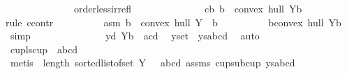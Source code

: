 \begin{isabellebody}
\ \ \ \ \ \ \ \ \ \ \ \ \ \ order{\isacharunderscore}{\kern0pt}less{\isacharunderscore}{\kern0pt}irrefl{\isacharparenright}{\kern0pt}\isanewline
\ \ \ \ \ \ \isamarkupfalse%
\isanewline
\ \ \ \ \ \ \isamarkupfalse%
\ cb{\isacharcolon}{\kern0pt}{\isachardoublequoteopen}{\isasymnot}\ b\ {\isasymin}\ convex\ hull\ {\isacharparenleft}{\kern0pt}Y{\isacharminus}{\kern0pt}{\isacharbraceleft}{\kern0pt}b{\isacharbraceright}{\kern0pt}{\isacharparenright}{\kern0pt}{\isachardoublequoteclose}\isanewline
\ \ \ \ \ \ \isamarkupfalse%
{\isacharparenleft}{\kern0pt}rule\ ccontr{\isacharparenright}{\kern0pt}\isanewline
\ \ \ \ \ \ \ \ \isamarkupfalse%
\ asm{\isacharcolon}{\kern0pt}{\isachardoublequoteopen}{\isasymnot}\ b\ {\isasymnotin}\ convex\ hull\ {\isacharparenleft}{\kern0pt}Y\ {\isacharminus}{\kern0pt}\ {\isacharbraceleft}{\kern0pt}b{\isacharbraceright}{\kern0pt}{\isacharparenright}{\kern0pt}{\isachardoublequoteclose}\isanewline
\ \ \ \ \ \ \ \ \isamarkupfalse%
\ {\isachardoublequoteopen}b{\isasymin}convex\ hull\ {\isacharparenleft}{\kern0pt}Y{\isacharminus}{\kern0pt}{\isacharbraceleft}{\kern0pt}b{\isacharbraceright}{\kern0pt}{\isacharparenright}{\kern0pt}{\isachardoublequoteclose}\ \isamarkupfalse%
\ simp\isanewline
\ \ \ \ \ \ \ \ \ \ \ \ \ \isamarkupfalse%
\ y{\isacharunderscore}{\kern0pt}d{\isacharcolon}{\kern0pt}\ {\isachardoublequoteopen}Y{\isacharminus}{\kern0pt}{\isacharbraceleft}{\kern0pt}b{\isacharbraceright}{\kern0pt}\ {\isacharequal}{\kern0pt}\ {\isacharbraceleft}{\kern0pt}a{\isacharcomma}{\kern0pt}c{\isacharcomma}{\kern0pt}d{\isacharbraceright}{\kern0pt}{\isachardoublequoteclose}\ \isamarkupfalse%
\ y{\isacharunderscore}{\kern0pt}set\ {\isachardoublequoteopen}{}{}{\isachardoublequoteclose}\ ys{\isacharunderscore}{\kern0pt}abcd\ \isamarkupfalse%
\ auto\isanewline
\ \ \ \ \ \ \ \ \isamarkupfalse%
\ cup{\isacharunderscore}{\kern0pt}ls{\isacharcolon}{\kern0pt}{\isachardoublequoteopen}cup\ {}\ {\isacharbrackleft}{\kern0pt}a{\isacharcomma}{\kern0pt}b{\isacharcomma}{\kern0pt}c{\isacharcomma}{\kern0pt}d{\isacharbrackright}{\kern0pt}{\isachardoublequoteclose}\ \isanewline
\ \ \ \ \ \ \ \ \ \ \isamarkupfalse%
\ {\isacharparenleft}{\kern0pt}metis\ {\isachardoublequoteopen}{}{\isachardoublequoteclose}\ {\isacartoucheopen}length\ {\isacharparenleft}{\kern0pt}sorted{\isacharunderscore}{\kern0pt}list{\isacharunderscore}{\kern0pt}of{\isacharunderscore}{\kern0pt}set\ Y{\isacharparenright}{\kern0pt}\ {\isacharequal}{\kern0pt}\ {}{\isacartoucheclose}\ abcd\ assms\ cup{\isacharunderscore}{\kern0pt}sub{\isacharunderscore}{\kern0pt}cup\ ys{\isacharunderscore}{\kern0pt}abcd{\isacharparenright}{\kern0pt}\isanewline

\end{isabellebody}
